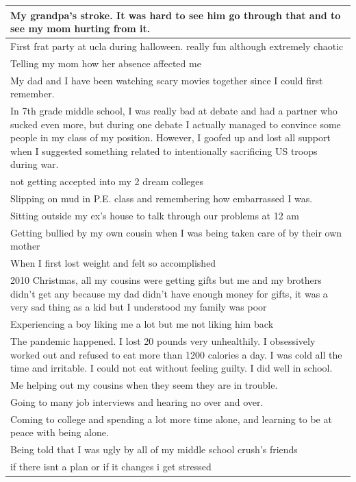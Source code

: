 \documentclass[
  .7em,
  letterpaper,
  DIV=11,
  numbers=noendperiod]{scrartcl}
\begin{document}
\begin{table}
\begin{tabular}{l}
\hline
My grandpa's stroke. It was hard to see him go through that and to see my mom hurting from it.\\
\hline
First frat party at ucla during halloween. really fun although extremely chaotic\\
\hline
Telling my mom how her absence affected me\\
\hline
My dad and I have been watching scary movies together since I could first remember.\\
\hline
In 7th grade middle school, I was really bad at debate and had a partner who sucked even more, but during one debate I actually managed to convince some people in my class of my position. However, I goofed up and lost all support when I suggested something related to intentionally sacrificing US troops during war.\\
\hline
not getting accepted into my 2 dream colleges\\
\hline
Slipping on mud in P.E. class and remembering how embarrassed I was.\\
\hline
Sitting outside my ex's house to talk through our problems at 12 am\\
\hline
Getting bullied by my own cousin when I was being taken care of by their own mother\\
\hline
When I first lost weight and felt so accomplished\\
\hline
2010 Christmas, all my cousins were getting gifts but me and my brothers didn't get any because my dad didn't have enough money for gifts, it was a very sad thing as a kid but I understood my family was poor\\
\hline
Experiencing a boy liking me a lot but me not liking him back\\
\hline
The pandemic happened. I lost 20 pounds very unhealthily. I obsessively worked out and refused to eat more than 1200 calories a day. I was cold all the time and irritable. I could not eat without feeling guilty. I did well in school.\\
\hline
Me helping out my cousins when they seem they are in trouble.\\
\hline
Going to many job interviews and hearing no over and over.\\
\hline
Coming to college and spending a lot more time alone, and learning to be at peace with being alone.\\
\hline
Being told that I was ugly by all of my middle school crush's friends\\
\hline
if there isnt a plan or if it changes i get stressed\\

\end{tabular}
\end{table}
\end{document}
